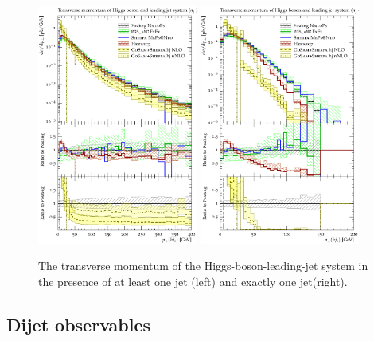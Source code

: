 \begin{figure}[t!]
  \centering
  \includegraphics[width=0.47\textwidth]{figures/hjetscomp_Hj_pT_incl.pdf}
  \quad
  \includegraphics[width=0.47\textwidth]{figures/hjetscomp_Hj_pT_excl.pdf}
  \caption{
    The transverse momentum of the Higgs-boson-leading-jet system in the 
    presence of at least one jet (left) and exactly one jet(right).
    \label{fig:higgscomp:results:1obs:hjpt}
  }
\end{figure}


\subsection{Dijet observables}
\label{sec:hjetscomp:results:2jobs}

